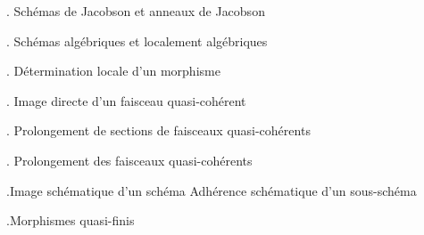 \noindent{}. Schémas de Jacobson et anneaux de Jacobson\dotfill

\noindent{}. Schémas algébriques et localement algébriques\dotfill

\noindent{}. Détermination locale d'un morphisme\dotfill

\noindent{}. Image directe d'un faisceau quasi-cohérent\dotfill

\noindent{}. Prolongement de sections de faisceaux quasi-cohérents

\noindent{}. Prolongement des faisceaux quasi-cohérents\dotfill

\noindent{}.Image schématique d'un schéma Adhérence schématique d'un sous-schéma\dotfill

\noindent{}.Morphismes quasi-finis\dotfill

